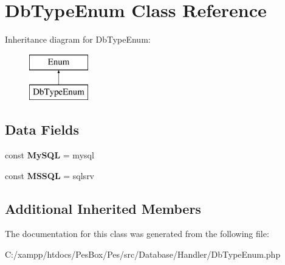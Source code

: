 \hypertarget{class_pes_1_1_database_1_1_handler_1_1_db_type_enum}{}\section{Db\+Type\+Enum Class Reference}
\label{class_pes_1_1_database_1_1_handler_1_1_db_type_enum}
Inheritance diagram for Db\+Type\+Enum\+:\begin{figure}[H]
\begin{center}
\leavevmode
\includegraphics[height=2.000000cm]{class_pes_1_1_database_1_1_handler_1_1_db_type_enum}
\end{center}
\end{figure}
\subsection*{Data Fields}
\begin{DoxyCompactItemize}
\item 
\mbox{\label{class_pes_1_1_database_1_1_handler_1_1_db_type_enum_ad2149efa69298b60d39798d92a502536}} 
const {\bfseries My\+S\+QL} = \textquotesingle{}mysql\textquotesingle{}
\item 
\mbox{\label{class_pes_1_1_database_1_1_handler_1_1_db_type_enum_a6892ec7aee03db18364b08160ffcd7f0}} 
const {\bfseries M\+S\+S\+QL} = \textquotesingle{}sqlsrv\textquotesingle{}
\end{DoxyCompactItemize}
\subsection*{Additional Inherited Members}


The documentation for this class was generated from the following file\+:\begin{DoxyCompactItemize}
\item 
C\+:/xampp/htdocs/\+Pes\+Box/\+Pes/src/\+Database/\+Handler/Db\+Type\+Enum.\+php\end{DoxyCompactItemize}
